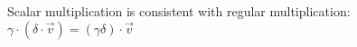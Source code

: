 \documentclass[preview]{standalone}
\begin{document}
\begin{center}
Scalar multiplication is consistent with regular multiplication: $ \gamma\cdot(\delta \cdot \overrightarrow{v}) = ( \gamma\delta) \cdot \overrightarrow{v} $
\end{center}
\end{document}
